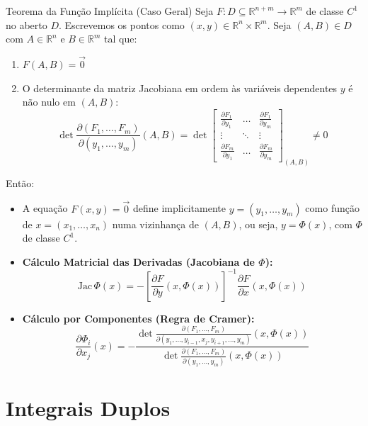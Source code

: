 \documentclass[11pt,a4paper]{article}
\newcommand{\R}{\mathbb{R}}
\begin{document}
\noindent\begin{theorembox}{Teorema da Função Implícita (Caso Geral)}
  Seja $F : D \subseteq \R^{n+m} \to \R^m$ de classe $C^1$ no aberto $D$. Escrevemos os pontos como $(x, y) \in \R^n \times \R^m$. Seja $(A, B) \in D$ com $A \in \R^n$ e $B \in \R^m$ tal que:
  \begin{enumerate}
    \item $F(A, B) = \vec{0}$
    \item O determinante da matriz Jacobiana em ordem às variáveis dependentes $y$ é não nulo em $(A, B)$:
      \[ \det \frac{\partial(F_1, \dots, F_m)}{\partial(y_1, \dots, y_m)}(A, B) = \det \begin{bmatrix} \frac{\partial F_1}{\partial y_1} & \dots & \frac{\partial F_1}{\partial y_m} \\ \vdots & \ddots & \vdots \\ \frac{\partial F_m}{\partial y_1} & \dots & \frac{\partial F_m}{\partial y_m} \end{bmatrix}_{(A, B)} \neq 0 \]
  \end{enumerate}
  Então:
  \begin{itemize}
    \item A equação $F(x, y) = \vec{0}$ define implicitamente $y = (y_1, \dots, y_m)$ como função de $x = (x_1, \dots, x_n)$ numa vizinhança de $(A, B)$, ou seja, $y = \Phi(x)$, com $\Phi$ de classe $C^1$.
    \item \textbf{Cálculo Matricial das Derivadas (Jacobiana de $\Phi$):}
      \[ \text{Jac}\,\Phi(x) = - \left[ \frac{\partial F}{\partial y}(x, \Phi(x)) \right]^{-1} \frac{\partial F}{\partial x}(x, \Phi(x)) \]
    \item \textbf{Cálculo por Componentes (Regra de Cramer):}
      \[ \frac{\partial \Phi_i}{\partial x_j}(x) = - \frac{\det \frac{\partial(F_1, \dots, F_m)}{\partial(y_1, \dots, y_{i-1}, x_j, y_{i+1}, \dots, y_m)}(x, \Phi(x))}{\det \frac{\partial(F_1, \dots, F_m)}{\partial(y_1, \dots, y_m)}(x, \Phi(x))} \]
  \end{itemize}
\end{theorembox}

\newpage

\section{Integrais Duplos}
\label{chap:integrais_duplos}
\end{document}
